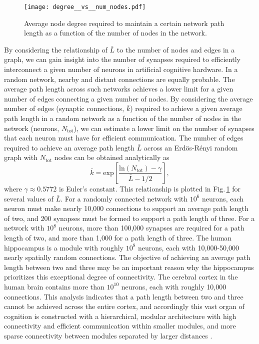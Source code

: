\documentclass[twocolumn]{article}
\begin{document}
\begin{figure}
    \centering
    \texttt{[image: degree\_\_vs\_\_num\_nodes.pdf]} %
    \caption{Average node degree required to maintain a certain network path length as a function of the number of nodes in the network.}
    \label{fig:degree_vs_num_nodes}
\end{figure}
By considering the relationship of $\bar{L}$ to the number of nodes and edges in a graph, we can gain insight into the number of synapses required to efficiently interconnect a given number of neurons in artificial cognitive hardware. In a random network, nearby and distant connections are equally probable. The average path length across such networks achieves a lower limit for a given number of edges connecting a given number of nodes. By considering the average number of edges (synaptic connections, $\bar{k}$) required to achieve a given average path length in a random network as a function of the number of nodes in the network (neurons, $N_{\mathrm{tot}}$), we can estimate a lower limit on the number of synapses that each neuron must have for efficient communication. The number of edges required to achieve an average path length $\bar{L}$ across an Erd\"{o}s-R\'{e}nyi random graph with $N_{\mathrm{tot}}$ nodes can be obtained analytically as \cite{frfr2004}
\begin{equation}
\label{eq:degree}
\bar{k} = \mathrm{exp} \left[ \frac{\mathrm{ln}(N_{\mathrm{tot}})-\gamma}{\bar{L}-1/2} \right],
\end{equation}
where $\gamma \approx 0.5772$ is Euler's constant. This relationship is plotted in Fig.\,\ref{fig:degree_vs_num_nodes} for several values of $\bar{L}$. For a randomly connected network with $10^6$ neurons, each neuron must make nearly 10,000 connections to support an average path length of two, and 200 synapses must be formed to support a path length of three. For a network with $10^8$ neurons, more than 100,000 synapses are required for a path length of two, and more than 1,000 for a path length of three. The human hippocampus is a module with roughly $10^8$ neurons, each with 10,000-50,000 nearly spatially random connections. The objective of achieving an average path length between two and three may be an important reason why the hippocampus prioritizes this exceptional degree of connectivity. The cerebral cortex in the human brain contains more than $10^{10}$ neurons, each with roughly 10,000 connections. This analysis indicates that a path length between two and three cannot be achieved across the entire cortex, and accordingly this vast organ of cognition is constructed with a hierarchical, modular architecture \cite{si1962,ne2006} with high connectivity and efficient communication within smaller modules, and more sparse connectivity between modules separated by larger distances \cite{mo1997,mela2009,bosp2015,beba2017}.
\end{document}
